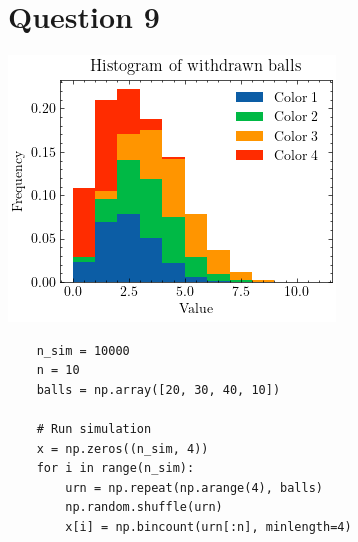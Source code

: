 \documentclass{article}
\begin{document}
\section*{Question 9}
\includegraphics[scale=0.7]{imgs/balls.png}  \\
\begin{verbatim}
    n_sim = 10000
    n = 10
    balls = np.array([20, 30, 40, 10])

    # Run simulation
    x = np.zeros((n_sim, 4))
    for i in range(n_sim):
        urn = np.repeat(np.arange(4), balls)
        np.random.shuffle(urn)
        x[i] = np.bincount(urn[:n], minlength=4)
\end{verbatim}
\end{document}
